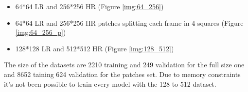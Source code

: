 \begin{itemize}
  \item 64*64 LR and 256*256 HR (Figure \ref{img:64_256})
  \item 64*64 LR and 256*256 HR patches splitting each frame in 4 squares (Figure \ref{img:64_256_p})
  \item 128*128 LR and 512*512 HR (Figure \ref{img:128_512})
\end{itemize}

The size of the datasets are 2210 training and 249 validation for the full size one and 8652 taining 624 validation for the patches set. Due to memory constraints it's not been possible to train every model with the 128 to 512 dataset.
